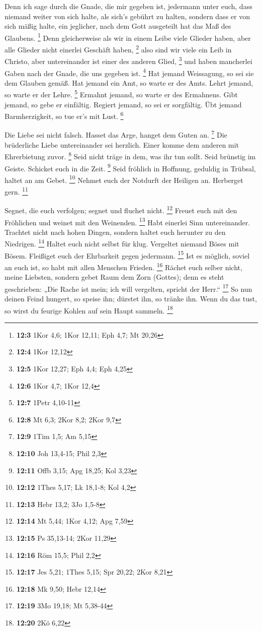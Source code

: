  Denn ich sage durch die Gnade, die mir gegeben ist,
jedermann unter euch, dass niemand weiter von sich halte, als sich's
gebührt zu halten, sondern dass er von sich mäßig halte, ein jeglicher,
nach dem Gott ausgeteilt hat das Maß des Glaubens. \footnote{\textbf{12:3}
  1Kor 4,6; 1Kor 12,11; Eph 4,7; Mt 20,26}  Denn
gleicherweise als wir in einem Leibe viele Glieder haben, aber alle
Glieder nicht einerlei Geschäft haben, \footnote{\textbf{12:4} 1Kor
  12,12}  also sind wir viele ein Leib in Christo, aber
untereinander ist einer des anderen Glied, \footnote{\textbf{12:5} 1Kor
  12,27; Eph 4,4; Eph 4,25}  und haben mancherlei Gaben nach
der Gnade, die uns gegeben ist. \footnote{\textbf{12:6} 1Kor 4,7; 1Kor
  12,4}  Hat jemand Weissagung, so sei sie dem Glauben
gemäß. Hat jemand ein Amt, so warte er des Amts. Lehrt jemand, so warte
er der Lehre. \footnote{\textbf{12:7} 1Petr 4,10-11} 
Ermahnt jemand, so warte er des Ermahnens. Gibt jemand, so gebe er
einfältig. Regiert jemand, so sei er sorgfältig. Übt jemand
Barmherzigkeit, so tue er's mit Lust. \footnote{\textbf{12:8} Mt 6,3;
  2Kor 8,2; 2Kor 9,7}

 Die Liebe sei nicht falsch. Hasset das Arge, hanget dem
Guten an. \footnote{\textbf{12:9} 1Tim 1,5; Am 5,15}  Die
brüderliche Liebe untereinander sei herzlich. Einer komme dem anderen
mit Ehrerbietung zuvor. \footnote{\textbf{12:10} Joh 13,4-15; Phil 2,3}
 Seid nicht träge in dem, was ihr tun sollt. Seid brünstig
im Geiste. Schicket euch in die Zeit. \footnote{\textbf{12:11} Offb
  3,15; Apg 18,25; Kol 3,23}  Seid fröhlich in Hoffnung,
geduldig in Trübsal, haltet an am Gebet. \footnote{\textbf{12:12} 1Thes
  5,17; Lk 18,1-8; Kol 4,2}  Nehmet euch der Notdurft der
Heiligen an. Herberget gern. \footnote{\textbf{12:13} Hebr 13,2; 3Jo
  1,5-8}

 Segnet, die euch verfolgen; segnet und fluchet nicht.
\footnote{\textbf{12:14} Mt 5,44; 1Kor 4,12; Apg 7,59} 
Freuet euch mit den Fröhlichen und weinet mit den Weinenden. \footnote{\textbf{12:15}
  Ps 35,13-14; 2Kor 11,29}  Habt einerlei Sinn
untereinander. Trachtet nicht nach hohen Dingen, sondern haltet euch
herunter zu den Niedrigen. \footnote{\textbf{12:16} Röm 15,5; Phil 2,2}
 Haltet euch nicht selbst für klug. Vergeltet niemand Böses
mit Bösem. Fleißiget euch der Ehrbarkeit gegen jedermann. \footnote{\textbf{12:17}
  Jes 5,21; 1Thes 5,15; Spr 20,22; 2Kor 8,21}  Ist es
möglich, soviel an euch ist, so habt mit allen Menschen Frieden.
\footnote{\textbf{12:18} Mk 9,50; Hebr 12,14}  Rächet euch
selber nicht, meine Liebsten, sondern gebet Raum dem Zorn (Gottes); denn
es steht geschrieben: „Die Rache ist mein; ich will vergelten, spricht
der Herr.`` \footnote{\textbf{12:19} 3Mo 19,18; Mt 5,38-44}
 So nun deinen Feind hungert, so speise ihn; dürstet ihn,
so tränke ihn. Wenn du das tust, so wirst du feurige Kohlen auf sein
Haupt sammeln. \footnote{\textbf{12:20} 2Kö 6,22}

